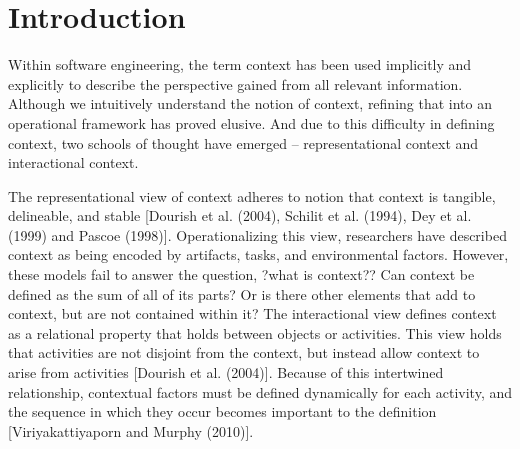 
\section{Introduction}







Within software engineering, the term context has been used implicitly and explicitly to describe the perspective gained from all relevant information. Although we intuitively understand the notion of context, refining that into an operational framework has proved elusive. And due to this difficulty in defining context, two schools of thought have emerged -- representational context and interactional context.

The representational view of context adheres to notion that context is tangible, delineable, and stable [Dourish et al. (2004), Schilit et al. (1994), Dey et al. (1999) and Pascoe (1998)]. Operationalizing this view, researchers have described context as being encoded by artifacts, tasks, and environmental factors. However, these models fail to answer the question, ?what is context?? Can context be defined as the sum of all of its parts? Or is there other elements that add to context, but are not contained within it?
The interactional view defines context as a relational property that holds between objects or activities. This view holds that activities are not disjoint from the context, but instead allow context to arise from activities [Dourish et al. (2004)]. Because of this intertwined relationship, contextual factors must be defined dynamically for each activity, and the sequence in which they occur becomes important to the definition [Viriyakattiyaporn and Murphy (2010)].

